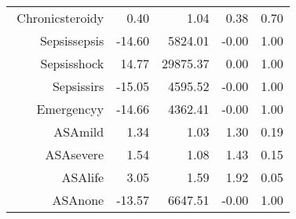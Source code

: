 \begin{tabular}{rrrrr}
$$  Chronic\-steroid\-y & 0.40 & 1.04 & 0.38 & 0.70 \\ 
  Sepsis\-sepsis & -14.60 & 5824.01 & -0.00 & 1.00 \\ 
  Sepsis\-shock & 14.77 & 29875.37 & 0.00 & 1.00 \\ 
  Sepsis\-sirs & -15.05 & 4595.52 & -0.00 & 1.00 \\ 
  Emergency\-y & -14.66 & 4362.41 & -0.00 & 1.00 \\ 
  ASA\-mild & 1.34 & 1.03 & 1.30 & 0.19 \\ 
  ASA\-severe & 1.54 & 1.08 & 1.43 & 0.15 \\ 
  ASA\-life & 3.05 & 1.59 & 1.92 & 0.05 \\ 
  ASA\-none & -13.57 & 6647.51 & -0.00 & 1.00 \\ 
   \hline
\end{tabular}

